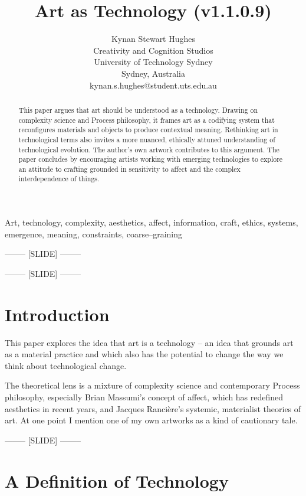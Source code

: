 \documentclass[letter:wpaper]{article}
\title{Art as Technology (v1.1.0.9)}
\author{Kynan Stewart Hughes\\
Creativity and Cognition Studios\\
University of Technology Sydney\\
Sydney, Australia\\
kynan.s.hughes@student.uts.edu.au\\
\newline
\newline
}
\begin{document}
 
\maketitle
\begin{abstract}
    This paper argues that art should be understood as a technology. Drawing on complexity science and Process philosophy, it frames art as a codifying system that reconfigures materials and objects to produce contextual meaning. Rethinking art in technological terms also invites a more nuanced, ethically attuned understanding of technological evolution. The author’s own artwork contributes to this argument. The paper concludes by encouraging artists working with emerging technologies to explore an attitude to crafting grounded in sensitivity to affect and the complex interdependence of things.
\end{abstract}


Art, technology, complexity, aesthetics, affect, information, craft, ethics, systems, emergence, meaning, constraints, coarse–graining

-------- [SLIDE] --------

-------- [SLIDE] --------

\section{Introduction}

    This paper explores the idea that art is a technology \citep[pp.74–75]{SauvagnarguesArtmchns2016} \citep{GellThTchnlgyOfEnchntmnt1992} \citep[p.202]{OSullivanFrmAsthtcsToThAbstrctMchn2010} -- an idea that grounds art as a material practice and which also has the potential to change the way we think about technological change. 
    
    The theoretical lens is a mixture of complexity science and contemporary Process philosophy, especially Brian Massumi's concept of affect, which has redefined aesthetics in recent years, and Jacques Rancière's systemic, materialist theories of art. At one point I mention one of my own artworks as a kind of cautionary tale.

-------- [SLIDE] --------

\section{A Definition of Technology} 
\end{document}
